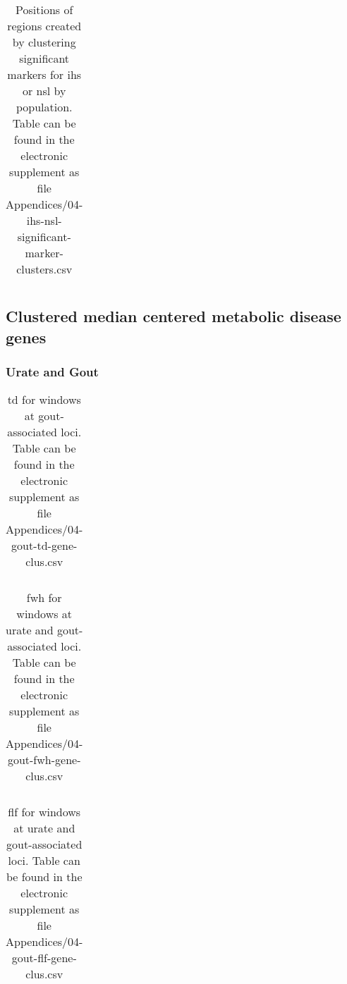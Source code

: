 \documentclass[twoside,openright]{report}
\begin{document}
\begin{appendices}
\begin{table}[!htb]
\caption[Positions of regions created by clustering significant markers for \acrshort{ihs} or \acrshort{nsl} by population.]{Positions of regions created by clustering significant markers for \gls{ihs} or \gls{nsl} by population. Table can be found in the electronic supplement as file Appendices/04-ihs-nsl-significant-marker-clusters.csv}
\centering
  \begin{tabular}{l l}
  \end{tabular}
  \label{tab:hapclustab}
\end{table}

\FloatBarrier

\subsection{Clustered median centered metabolic disease
genes}\label{clustered-median-centered-metabolic-disease-genes}

\subsubsection{Urate and Gout}\label{urate-and-gout}

\begin{table}[!htb]
\caption[\gls{td} for windows at gout-associated loci.]{\gls{td} for windows at gout-associated loci. Table can be found in the electronic supplement as file Appendices/04-gout-td-gene-clus.csv}
\centering
  \begin{tabular}{l l}
  \end{tabular}
  \label{tab:gouttdgeneclus}
\end{table}

\begin{table}[!htb]
\caption[\gls{fwh} for windows at urate and gout-associated loci.]{\gls{fwh} for windows at urate and gout-associated loci. Table can be found in the electronic supplement as file Appendices/04-gout-fwh-gene-clus.csv}
\centering
  \begin{tabular}{l l}
  \end{tabular}
  \label{tab:goutfwhgeneclus}
\end{table}

\begin{table}[!htb]
\caption[\gls{flf} for windows at urate and gout-associated loci.]{\gls{flf} for windows at urate and gout-associated loci. Table can be found in the electronic supplement as file Appendices/04-gout-flf-gene-clus.csv}
\centering
  \begin{tabular}{l l}
  \end{tabular}
  \label{tab:goutflfgeneclus}
\end{table}


\end{appendices}
\end{document}
